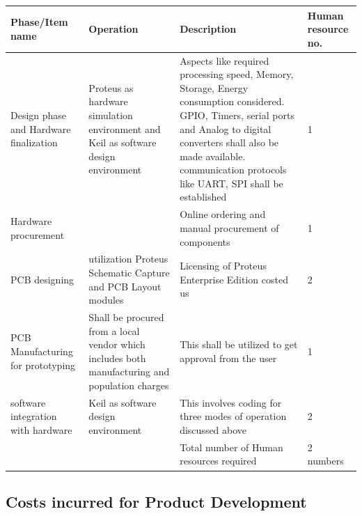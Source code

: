 \documentclass{FR16}
\begin{document}
\begin{center}
\begin{tabular}{||p{3 cm} ||p{4 cm}|| p{6 cm}|| |p{2 cm}|| }
\arrayrulecolor{Azzurro}
\hline
\hline

{\bfseries Phase/Item name } & {\bfseries Operation}& {\bfseries Description} & {\bfseries Human resource no.} \\
\hline
\hline
Design phase and Hardware finalization& Proteus as hardware simulation environment and Keil as
software design environment &  Aspects like required  processing speed, Memory, Storage, Energy consumption considered. GPIO, Timers, serial ports and Analog to digital converters shall also be made available. communication protocols like UART, SPI shall be established &1\\
\hline
\hline
Hardware procurement & &Online ordering and manual procurement of components & 1 \\
\hline
\hline
PCB designing & utilization Proteus Schematic Capture and PCB Layout modules  & Licensing of Proteus Enterprise Edition costed us&2\\ 
\hline 
\hline
PCB Manufacturing for prototyping & Shall be procured from a local vendor which includes both manufacturing and population charges & This shall be utilized to get approval from the user&1 \\
\hline 
\hline
software integration with hardware &Keil as
software design environment & This involves coding for three modes of operation discussed above  & 2\\
\hline
\hline
&  &Total number of Human resources required & 2 numbers
 
 \end{tabular}
\end{center}











\newpage

\subsection{Costs incurred for Product Development}

\end{document}
